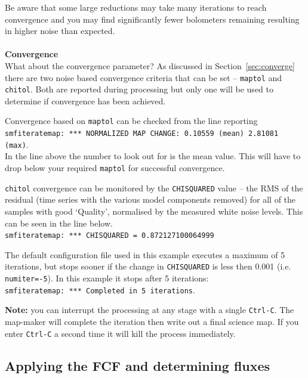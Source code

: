 \documentclass[twoside,11pt]{article}
\newcommand{\xlabel}[1]{}
\renewcommand{\_}{\texttt{\symbol{95}}}
\begin{document}
Be aware that some large reductions may take many iterations to reach
convergence and you may find significantly fewer bolometers remaining
resulting in higher noise than expected.
\\ \\
\textbf{Convergence}\\
What about the convergence parameter? As discussed in
Section~\ref{sec:converge} there are two noise based convergence
criteria that can be set -- \texttt{maptol} and \texttt{chitol}. Both
are reported during processing but only one will be used to determine
if convergence has been achieved.

Convergence based on \texttt{maptol} can be checked from the line
reporting\\
\hspace{5mm}\texttt{smf\_iteratemap: *** NORMALIZED MAP
CHANGE: 0.10559 (mean) 2.81081 (max)}.\\
In the line above the number to look out for is the mean value. This
will have to drop below your required \texttt{maptol} for successful
convergence.

\texttt{chitol} convergence can be monitored by the
\texttt{CHISQUARED} value -- the RMS of the residual (time series with
the various model components removed) for all of the samples with good
`Quality', normalised by the measured white noise levels. This can be
seen in the line below.\\
\hspace{0.5cm}\texttt{smf\_iteratemap: *** CHISQUARED = 0.872127100064999}


The default configuration file used in this example executes a maximum
of 5 iterations, but stops sooner if the change in \texttt{CHISQUARED}
is less then 0.001 (i.e. \texttt{numiter=-5}). In this example it
stops after 5 iterations: \\
\texttt{smf\_iteratemap: *** Completed in 5 iterations}.


\textbf{Note:} you can interrupt the processing at any stage with a
single \texttt{Ctrl-C}. The map-maker will complete the iteration then write
out a final science map. If you enter \texttt{Ctrl-C} a second time it will
kill the process immediately.


\subsection{\xlabel{apply_fcf}Applying the FCF and determining fluxes}
\label{sec:cmult}
\end{document}
